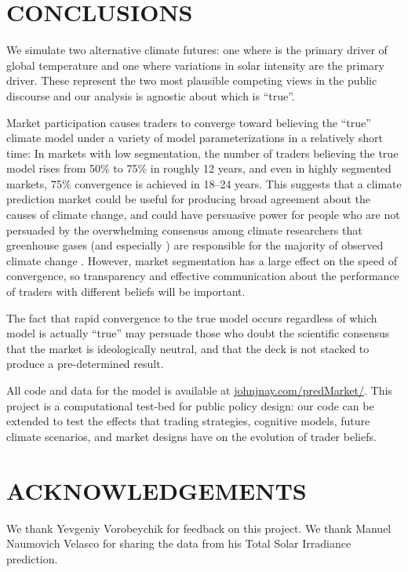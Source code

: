 \documentclass{article}\usepackage[]{graphicx}\usepackage[]{color}
\begin{document}
\section{CONCLUSIONS}

We simulate two alternative climate futures: one where  is the primary driver of global temperature and one where variations in solar intensity are the primary driver. These represent the two most plausible competing views in the public discourse and our analysis is agnostic about which is ``true''.

Market participation causes traders to converge toward believing the ``true'' climate model under a variety of model parameterizations in a relatively short time: In markets with low segmentation, the number of traders believing the true model rises from 50\% to 75\% in roughly 12 years, and even in highly segmented markets, 75\% convergence is achieved in 18--24 years. This suggests that a climate prediction market could be useful for producing broad agreement about the causes of climate change, and could have persuasive power for people who are not persuaded by the overwhelming consensus among climate researchers that greenhouse gases (and especially ) are responsible for the majority of observed climate change . However, market segmentation has a large effect on the speed of convergence, so transparency and effective communication about the performance of traders with different beliefs will be important.

The fact that rapid convergence to the true model occurs regardless of which model is actually ``true'' may persuade those who doubt the scientific consensus that the market is ideologically neutral, and that the deck is not stacked to produce a pre-determined result.

All code and data for the model is available at \href{http://johnjnay.com/predMarket/}{johnjnay.com/predMarket/}. This project is a computational test-bed for public policy design: our code can be extended to test the effects that trading strategies, cognitive models, future climate scenarios, and market designs have on the evolution of trader beliefs.

\section*{ACKNOWLEDGEMENTS}

We thank Yevgeniy Vorobeychik for feedback on this project. 
We thank Manuel Naumovich Velasco for sharing the data from his Total Solar Irradiance prediction.



\end{document}
